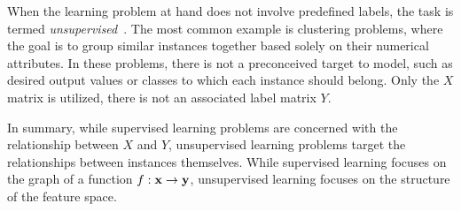 
When the learning problem at hand does not involve predefined labels, the task is termed \emph{unsupervised}~\cite[p.~486]{hastie2001elements}. The most common example is clustering problems, where the goal is to group similar instances together based solely on their numerical attributes. In these problems, there is not a preconceived target to model, such as desired output values or classes to which each instance should belong. Only the $X$ matrix is utilized, there is not an associated label matrix $Y$.

In summary, while supervised learning problems are concerned with the relationship between $X$ and $Y$, unsupervised learning problems target the relationships between instances themselves.
While supervised learning focuses on the graph of a function $f: \mathbf{x} \to \mathbf{y}$, unsupervised learning focuses on the structure of the feature space.

